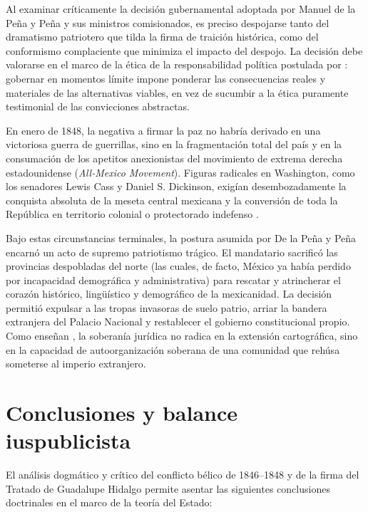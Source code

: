 \documentclass[12pt,spanish,letterpaper,oneside]{article}
\begin{document}
Al examinar cr\'iticamente la decisi\'on gubernamental adoptada por Manuel de la Pe\~na y Pe\~na y sus ministros comisionados, es preciso despojarse tanto del dramatismo patriotero que tilda la firma de traici\'on hist\'orica, como del conformismo complaciente que minimiza el impacto del despojo. La decisi\'on debe valorarse en el marco de la \'etica de la responsabilidad pol\'itica postulada por \citet[pp.~45--62]{kriele2022}: gobernar en momentos l\'imite impone ponderar las consecuencias reales y materiales de las alternativas viables, en vez de sucumbir a la \'etica puramente testimonial de las convicciones abstractas.

En enero de 1848, la negativa a firmar la paz no habr\'ia derivado en una victoriosa guerra de guerrillas, sino en la fragmentaci\'on total del pa\'is y en la consumaci\'on de los apetitos anexionistas del movimiento de extrema derecha estadounidense (\emph{All-Mexico Movement}). Figuras radicales en Washington, como los senadores Lewis Cass y Daniel S. Dickinson, exig\'ian desembozadamente la conquista absoluta de la meseta central mexicana y la conversi\'on de toda la Rep\'ublica en territorio colonial o protectorado indefenso \citep[pp.~82--96]{bosch1992,silvaHerzog1993}. 

Bajo estas circunstancias terminales, la postura asumida por De la Pe\~na y Pe\~na encarn\'o un acto de supremo patriotismo tr\'agico. El mandatario sacrific\'o las provincias despobladas del norte (las cuales, de facto, M\'exico ya hab\'ia perdido por incapacidad demogr\'afica y administrativa) para rescatar y atrincherar el coraz\'on hist\'orico, ling\"u\'istico y demogr\'afico de la mexicanidad. La decisi\'on permiti\'o expulsar a las tropas invasoras de suelo patrio, arriar la bandera extranjera del Palacio Nacional y restablecer el gobierno constitucional propio. Como ense\~nan \citet[pp.~245--260]{fixZamudio2018}, la soberan\'ia jur\'idica no radica en la extensi\'on cartogr\'afica, sino en la capacidad de autoorganizaci\'on soberana de una comunidad que reh\'usa someterse al imperio extranjero.

\section{Conclusiones y balance iuspublicista}

El an\'alisis dogm\'atico y cr\'itico del conflicto b\'elico de 1846--1848 y de la firma del Tratado de Guadalupe Hidalgo permite asentar las siguientes conclusiones doctrinales en el marco de la teor\'ia del Estado:
\end{document}
